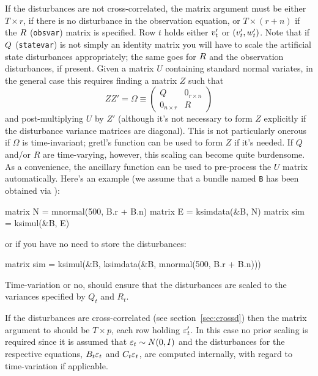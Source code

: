 \documentclass[a4paper]{article}
\begin{document}
If the disturbances are not cross-correlated, the matrix argument must
be either $T \times r$, if there is no disturbance in the observation
equation, or $T \times (r+n)$ if the $R$ (\texttt{obsvar})
matrix is specified. Row $t$ holds either $v_t'$ or
$(v_t', w_t')$. Note that if $Q$
(\texttt{statevar}) is not simply an identity matrix you will have to
scale the artificial state disturbances appropriately; the same goes
for $R$ and the observation disturbances, if present. Given a
matrix $U$ containing standard normal variates, in the general case
this requires finding a matrix $Z$ such that
\[
ZZ' = \Omega \equiv \left(
\begin{array}{ll}
Q & 0_{r \times n} \\
0_{n\times r} & R
\end{array}
\right)
\]
and post-multiplying $U$ by $Z'$ (although it's not necessary to form
$Z$ explicitly if the disturbance variance matrices are
diagonal). This is not particularly onerous if $\Omega$ is
time-invariant; gretl's  function can be used to form $Z$
if it's needed. If $Q$ and/or $R$ are time-varying, however, this
scaling can become quite burdensome. As a convenience, the ancillary
function  can be used to pre-process the $U$ matrix
automatically. Here's an example (we assume that a bundle named
\texttt{B} has been obtained via ):
%
\begin{code}
matrix N = mnormal(500, B.r + B.n)
matrix E = ksimdata(&B, N)
matrix sim = ksimul(&B, E)
\end{code}
%
or if you have no need to store the disturbances:
%
\begin{code}
matrix sim = ksimul(&B, ksimdata(&B, mnormal(500, B.r + B.n)))
\end{code}
%
Time-variation or no,  should ensure that the
disturbances are scaled to the variances specified by $Q_t$ and $R_t$.

If the disturbances are cross-correlated (see
section~\ref{sec:crossd}) then the matrix argument to 
should be $T \times p$, each row holding $\varepsilon_t'$. In this case
no prior scaling is required since it is assumed that
$\varepsilon_t \sim N(0, I)$ and the disturbances for the respective
equations, $B_t \varepsilon_t$ and $C_t \varepsilon_t$,
are computed internally, with regard to time-variation if applicable.
\end{document}
